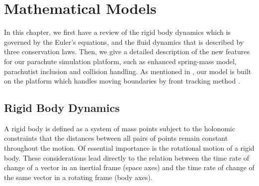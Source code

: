 \chapter{Mathematical Models}
\label{Chap:Models}

In this chapter, we first have a review of the rigid body dynamics which 
is governed by the Euler's equations, and the fluid dynamics that is 
described by three conservation laws. 
Then, we give a detailed description of the new features for our
parachute simulation platform, such as enhanced spring-mass model, parachutist 
inclusion and collision handling.
As mentioned in , our model is built on the platform
\FronTierp which handles moving boundaries by front tracking method 
\cite{GliGroLi99a,DuFixGli05}.



\section{Rigid Body Dynamics}
\label{Sec:RGD}
A rigid body is defined as a system of mass points subject to the holonomic 
constraints that the distances between all pairs of points remain constant 
throughout the motion. 
Of essential importance is the rotational motion of a rigid body. 
These considerations lead directly to the relation between the time rate of 
change of a vector in an inertial frame (space axes) and the time rate of 
change of the same vector in a rotating frame (body axes).

